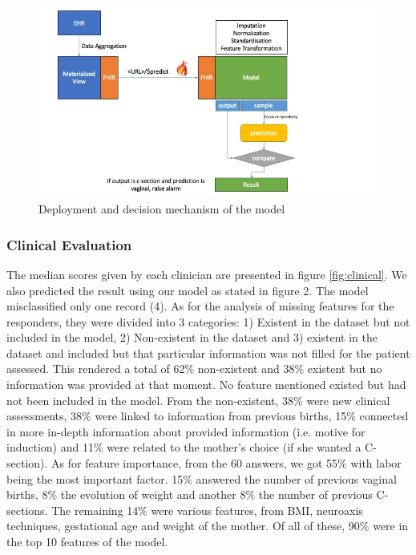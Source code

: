 
\begin{figure}[htbp]
\centering
\captionsetup{justification=centering}
\caption{Deployment and decision mechanism of the model}\label{fig:deploy} 
\includegraphics[scale=0.60]{figures/obs-model.jpg}
\end{figure}

\subsubsection{Clinical Evaluation}
The median scores given by each clinician are presented in figure \ref{fig:clinical}. We also predicted the result using our model as stated in figure 2. The model misclassified only one record (4). As for the analysis of missing features for the responders, they were divided into 3 categories: 1) Existent in the dataset but not included in the model, 2) Non-existent in the dataset and 3) existent in the dataset and included but that particular information was not filled for the patient assessed. This rendered a total of 62\% non-existent and 38\% existent but no information was provided at that moment. No feature mentioned existed but had not been included in the model. From the non-existent, 38\% were new clinical assessments, 38\% were linked to information from previous births, 15\% connected in more in-depth information about provided information (i.e. motive for induction) and 11\% were related to the mother’s choice (if she wanted a C-section). As for feature importance, from the 60 answers, we got 55\% with labor being the most important factor. 15\% answered the number of previous vaginal births, 8\% the evolution of weight and another 8\% the number of previous C-sections. The remaining 14\% were various features, from BMI, neuroaxis techniques, gestational age and weight of the mother. Of all of these, 90\% were in the top 10 features of the model.



